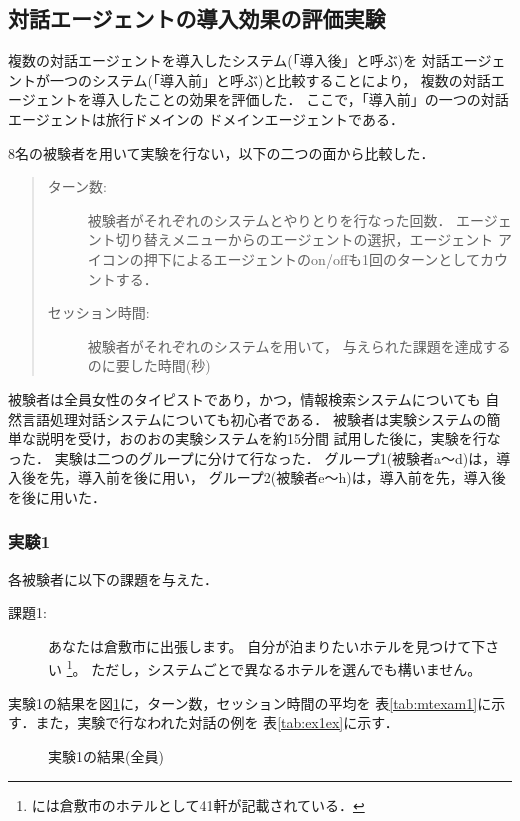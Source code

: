 \subsection{対話エージェントの導入効果の評価実験}

複数の対話エージェントを導入したシステム(「導入後」と呼ぶ)を
対話エージェントが一つのシステム(「導入前」と呼ぶ)と比較することにより，
複数の対話エージェントを導入したことの効果を評価した．
ここで，「導入前」の一つの対話エージェントは旅行ドメインの
ドメインエージェントである．

8名の被験者を用いて実験を行ない，以下の二つの面から比較した．
\begin{quote}
\begin{description}
\item[ターン数:] 被験者がそれぞれのシステムとやりとりを行なった回数．
エージェント切り替えメニューからのエージェントの選択，エージェント
アイコンの押下によるエージェントのon/offも1回のターンとしてカウントする．
\item[セッション時間:] 被験者がそれぞれのシステムを用いて，
与えられた課題を達成するのに要した時間(秒)
\end{description}
\end{quote}

被験者は全員女性のタイピストであり，かつ，情報検索システムについても
自然言語処理対話システムについても初心者である．
被験者は実験システムの簡単な説明を受け，おのおの実験システムを約15分間
試用した後に，実験を行なった．
実験は二つのグループに分けて行なった．
グループ1(被験者a〜d)は，導入後を先，導入前を後に用い，
グループ2(被験者e〜h)は，導入前を先，導入後を後に用いた．

\subsubsection{実験1}
各被験者に以下の課題を与えた．
\begin{description}
\item[課題1:] あなたは倉敷市に出張します。
自分が泊まりたいホテルを見つけて下さい
\footnote{\cite{jtb}には倉敷市のホテルとして41軒が記載されている．}。
ただし，システムごとで異なるホテルを選んでも構いません。
\end{description}

実験1の結果を図\ref{fig:exam1}に，ターン数，セッション時間の平均を
表\ref{tab:mtexam1}に示す．また，実験で行なわれた対話の例を
表\ref{tab:ex1ex}に示す．

\begin{figure}[htbp]
\begin{center}
\end{center}
\caption{実験1の結果(全員)}\label{fig:exam1}
\end{figure}

